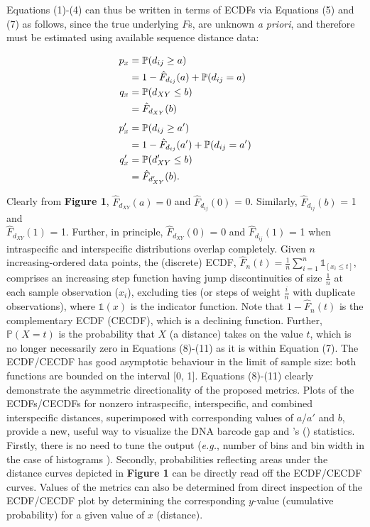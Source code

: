 \documentclass[12pt]{article}
\begin{document}
Equations (1)-(4) can thus be written in terms of ECDFs via Equations (5) and (7) as follows, since the true underlying $F$s, are unknown \textit{a priori}, and therefore must be estimated using available sequence distance data:

\begin{align}
p_x  &= \mathbb{P}(d_{ij} \geq a) \notag \\
     &= 1 - \hat{F}_{d_{ij}}(a) + \mathbb{P}(d_{ij} = a) \\
q_x  &=  \mathbb{P}(d_{XY} \leq b) \notag \\
     &= \hat{F}_{d_{XY}}(b) \\[1ex]
p'_x &=  \mathbb{P}(d_{ij} \geq a') \notag \\
     &= 1 - \hat{F}_{d_{ij}}(a') +  \mathbb{P}(d_{ij} = a') \\
q'_x &=  \mathbb{P}(d'_{XY} \leq b) \notag \\
     &= \hat{F}_{d'_{XY}}(b).
\end{align}

\noindent Clearly from \textbf{Figure 1}, $\hat{F}_{d_{XY}}(a) = 0$ and $\hat{F}_{d_{ij}}(0)$ = 0. Similarly, $\hat{F}_{d_{ij}}(b)$ = 1 and \\ $\hat{F}_{d_{XY}}(1)$ = 1. Further, in principle, $\hat{F}_{d_{XY}}(0)$ = 0 and $\hat{F}_{d_{ij}}(1)$ = 1 when intraspecific and interspecific distributions overlap completely. Given $n$ increasing-ordered data points, the (discrete) ECDF, $\hat{F}_n(t) = \frac{1}{n}\sum_{i = 1}^n\mathds{1}_{[x_i \leq t]}$, comprises an increasing step function having jump discontinuities of size $\frac{1}{n}$ at each sample observation ($x_i$), excluding ties (or steps of weight $\frac{i}{n}$ with duplicate observations), where $\mathds{1}(x)$ is the indicator function. Note that $1 - \hat{F}_n(t)$ is the complementary ECDF (CECDF), which is a declining function. Further, $\mathbb{P}(X = t)$ is the probability that $X$ (a distance) takes on the value $t$, which is no longer necessarily zero in Equations (8)-(11) as it is within Equation (7). The ECDF/CECDF has good asymptotic behaviour in the limit of sample size: both functions are bounded on the interval [0, 1]. Equations (8)-(11) clearly demonstrate the asymmetric directionality of the proposed metrics. Plots of the ECDFs/CECDFs for nonzero intraspecific, interspecific, and combined interspecific distances, superimposed with corresponding values of $a$/$a'$ and $b$, provide a new, useful way to visualize the DNA barcode gap and \citeauthor{phillips2024measure}'s (\citeyear{phillips2024measure}) statistics. Firstly, there is no need to tune the output (\textit{e.g.}, number of bins and bin width in the case of histograms \citep{phillips2022lack}). Secondly, probabilities reflecting areas under the distance curves depicted in \textbf{Figure 1} can be directly read off the ECDF/CECDF curves. Values of the metrics can also be determined from direct inspection of the ECDF/CECDF plot by determining the corresponding $y$-value (cumulative probability) for a given value of $x$ (distance). 
\end{document}
